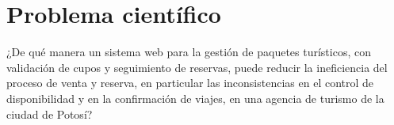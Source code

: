 \chapter{Problema científico}
\label{cap:problema-cientifico}

¿De qué manera un sistema web para la gestión de paquetes turísticos, con
validación de cupos y seguimiento de reservas, puede reducir la
ineficiencia del proceso de venta y reserva, en particular las
inconsistencias en el control de disponibilidad y en la confirmación de
viajes, en una agencia de turismo de la ciudad de Potosí?
